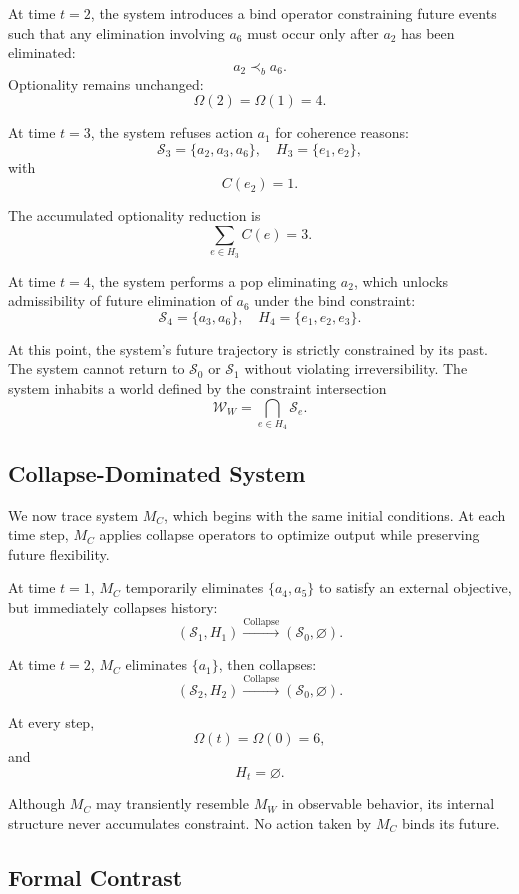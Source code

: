 \documentclass[11pt]{article}
\theoremstyle{remark}
\begin{document}
At time $t=2$, the system introduces a bind operator constraining future events such that any elimination involving $a_6$ must occur only after $a_2$ has been eliminated:
\[
a_2 \prec_b a_6.
\]
Optionality remains unchanged:
\[
\Omega(2) = \Omega(1) = 4.
\]

At time $t=3$, the system refuses action $a_1$ for coherence reasons:
\[
\mathcal{S}_3 = \{a_2, a_3, a_6\},
\quad
H_3 = \{e_1, e_2\},
\]
with
\[
C(e_2) = 1.
\]

The accumulated optionality reduction is
\[
\sum_{e \in H_3} C(e) = 3.
\]

At time $t=4$, the system performs a pop eliminating $a_2$, which unlocks admissibility of future elimination of $a_6$ under the bind constraint:
\[
\mathcal{S}_4 = \{a_3, a_6\},
\quad
H_4 = \{e_1, e_2, e_3\}.
\]

At this point, the system’s future trajectory is strictly constrained by its past. The system cannot return to $\mathcal{S}_0$ or $\mathcal{S}_1$ without violating irreversibility. The system inhabits a world defined by the constraint intersection
\[
\mathcal{W}_W = \bigcap_{e \in H_4} \mathcal{S}_e.
\]

\subsection{Collapse-Dominated System}

We now trace system $M_C$, which begins with the same initial conditions. At each time step, $M_C$ applies collapse operators to optimize output while preserving future flexibility.

At time $t=1$, $M_C$ temporarily eliminates $\{a_4, a_5\}$ to satisfy an external objective, but immediately collapses history:
\[
(\mathcal{S}_1, H_1) \xrightarrow{\mathrm{Collapse}} (\mathcal{S}_0, \varnothing).
\]

At time $t=2$, $M_C$ eliminates $\{a_1\}$, then collapses:
\[
(\mathcal{S}_2, H_2) \xrightarrow{\mathrm{Collapse}} (\mathcal{S}_0, \varnothing).
\]

At every step,
\[
\Omega(t) = \Omega(0) = 6,
\]
and
\[
H_t = \varnothing.
\]

Although $M_C$ may transiently resemble $M_W$ in observable behavior, its internal structure never accumulates constraint. No action taken by $M_C$ binds its future.

\subsection{Formal Contrast}
\end{document}

